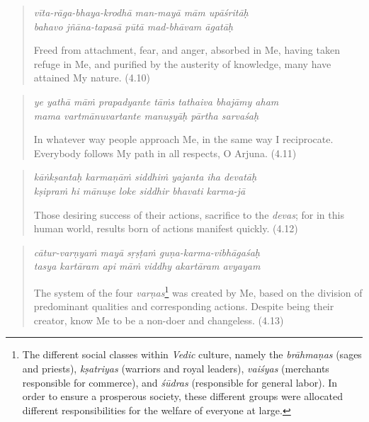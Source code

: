 \documentclass[12pt, twoside, openright]{memoir}
\begin{document}
\par
\begin{verse}
\textit{vīta-rāga-bhaya-krodhā man-mayā mām upāśritāḥ} \\
\textit{bahavo jñāna-tapasā pūtā mad-bhāvam āgatāḥ}

\noindent Freed from attachment, fear, and anger, absorbed in Me, having taken refuge in Me, and purified by the austerity of knowledge, many have attained My nature. (4.10)
\end{verse}
\par



\par
\begin{verse}
\textit{ye yathā māṁ prapadyante tāṁs tathaiva bhajāmy aham} \\
\textit{mama vartmānuvartante manuṣyāḥ pārtha sarvaśaḥ}

\noindent In whatever way people approach Me, in the same way I reciprocate. Everybody follows My path in all respects, O Arjuna. (4.11)
\end{verse}
\par



\par
\begin{verse}
\textit{kāṅkṣantaḥ karmaṇāṁ siddhiṁ yajanta iha devatāḥ} \\
\textit{kṣipraṁ hi mānuṣe loke siddhir bhavati karma-jā}

\noindent Those desiring success of their actions, sacrifice to the \textit{devas}; for in this human world, results born of actions manifest quickly. (4.12)
\end{verse}
\par



\par
\begin{verse}
\textit{cātur-varṇyaṁ mayā sṛṣṭaṁ guṇa-karma-vibhāgaśaḥ} \\
\textit{tasya kartāram api māṁ viddhy akartāram avyayam}

\noindent The system of the four \textit{varṇas}\footnote{The different social classes within \textit{Vedic} culture, namely the \textit{brāhmaṇas} (sages and priests), \textit{kṣatriyas} (warriors and royal leaders), \textit{vaiśyas} (merchants responsible for commerce), and \textit{śūdras} (responsible for general labor). In order to ensure a prosperous society, these different groups were allocated different responsibilities for the welfare of everyone at large.} was created by Me, based on the division of predominant qualities and corresponding actions. Despite being their creator, know Me to be a non-doer and changeless. (4.13)
\end{verse}
\par
\end{document}
